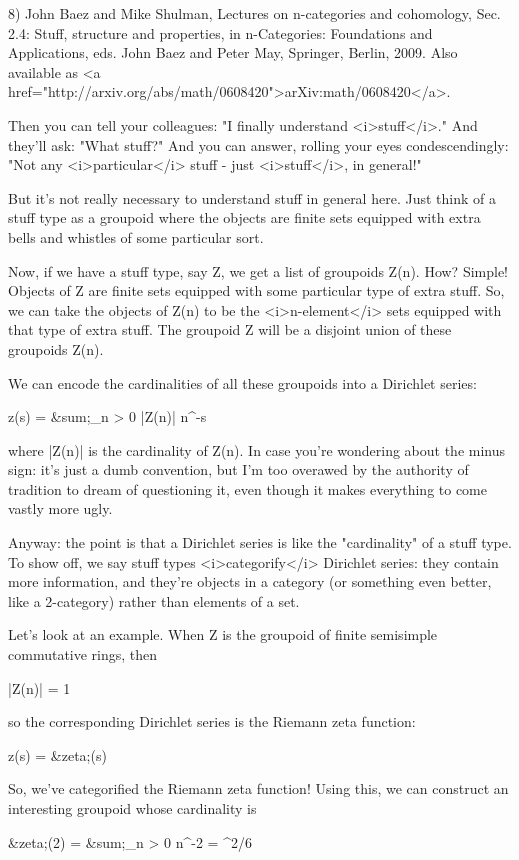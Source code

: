 8) John Baez and Mike Shulman, Lectures on n-categories and
cohomology, Sec. 2.4: Stuff, structure and properties, in
n-Categories: Foundations and Applications, eds. John Baez and Peter
May, Springer, Berlin, 2009.  Also available as <a
href="http://arxiv.org/abs/math/0608420">arXiv:math/0608420</a>.

Then you can tell your colleagues: "I finally understand
<i>stuff</i>."  And they'll ask: "What stuff?"  And you can answer,
rolling your eyes condescendingly: "Not any <i>particular</i> stuff -
just <i>stuff</i>, in general!"

But it's not really necessary to understand stuff in general here.
Just think of a stuff type as a groupoid where the objects are finite
sets equipped with extra bells and whistles of some particular sort.

Now, if we have a stuff type, say Z, we get a list of groupoids Z(n).
How?  Simple! Objects of Z are finite sets equipped with some
particular type of extra stuff.  So, we can take the objects of Z(n)
to be the <i>n-element</i> sets equipped with that type of extra
stuff.  The groupoid Z will be a disjoint union of these groupoids
Z(n).

We can encode the cardinalities of all these groupoids into a Dirichlet series:

z(s) = &sum;_{n > 0} |Z(n)| n^{-s}

where |Z(n)| is the cardinality of Z(n).  In case you're wondering
about the minus sign: it's just a dumb convention, but I'm too
overawed by the authority of tradition to dream of questioning it,
even though it makes everything to come vastly more ugly.

Anyway: the point is that a Dirichlet series is like the "cardinality"
of a stuff type.  To show off, we say stuff types <i>categorify</i>
Dirichlet series: they contain more information, and they're objects
in a category (or something even better, like a 2-category) rather
than elements of a set.

Let's look at an example.  When Z is the groupoid of finite semisimple
commutative rings, then

|Z(n)| = 1

so the corresponding Dirichlet series is the Riemann zeta function:

z(s) = &zeta;(s)

So, we've categorified the Riemann zeta function!  Using this, we can
construct an interesting groupoid whose cardinality is

&zeta;(2) = &sum;_{n > 0} n^{-2} = \pi ^{2}/6


